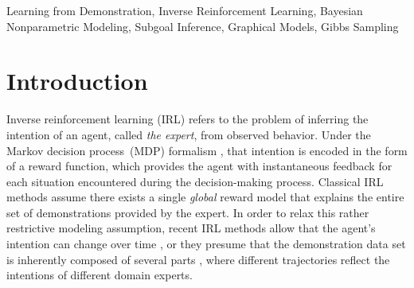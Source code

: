\documentclass[twoside,11pt]{article}
\newcommand{\eg}{e.g.}
\begin{document}
\begin{abstract}%
Advances in the field of inverse reinforcement learning (IRL) 
have %
led to sophisticated inference frameworks that relax the original modeling assumption %
of observing an agent behavior that reflects only a single intention. %
Instead of learning a global behavioral model, 
recent IRL methods divide the demonstration data into parts, to account for the fact that different trajectories may correspond to different intentions, \eg, because they were generated by different domain experts. In this work, we go one step further: using the intuitive concept of \textit{subgoals}, we build upon the premise that even a single trajectory can be explained more efficiently \textit{locally} within a certain context than globally, enabling a more compact representation of the observed behavior. Based on this assumption, we build an implicit intentional model of the agent's goals to forecast its behavior in unobserved situations. The result is an integrated Bayesian prediction framework %
%
that significantly outperforms existing IRL solutions and provides smooth policy estimates %
consistent with the expert's plan. Most notably, our framework %
naturally handles %
%
situations where the intentions of the agent change over time %
and classical IRL algorithms fail. %
In addition, due to its probabilistic nature, the model can be %
straightforwardly
applied in %
active learning %
scenarios to guide the demonstration process of the expert.
\end{abstract}

\begin{keywords}
	Learning from Demonstration, Inverse Reinforcement Learning, Bayesian Nonparametric Modeling, Subgoal Inference, Graphical Models, Gibbs Sampling
\end{keywords}


%

\section{Introduction}
Inverse reinforcement learning (IRL) refers to the problem of inferring %
the intention of an agent, called \textit{the expert},
%
from observed behavior. Under the Markov decision process~(MDP) formalism \citep{sutton1998reinforcement}, that intention is encoded in the form of a reward function, which provides the agent with instantaneous feedback for each situation %
%
encountered during the decision-making process. %
%
%
%
Classical IRL methods \citep{ng2000algorithms,abbeel2004apprenticeship,ziebart2008maximum,ramachandran2007bayesian,levine2011nonlinear} %
assume there exists a single \textit{global} reward %
model that explains the %
%
%
%
%
entire %
%
%
%
%
set of demonstrations provided by the expert.
In order to relax this rather restrictive modeling assumption, recent IRL methods allow that the agent's intention can change over time \citep{nguyen2015inverse}, or %
they presume that the demonstration data set is inherently composed of %
 several parts \citep{dimitrakakis2011bayesian}, %
 where different trajectories reflect the intentions of different domain experts. %
\end{document}
